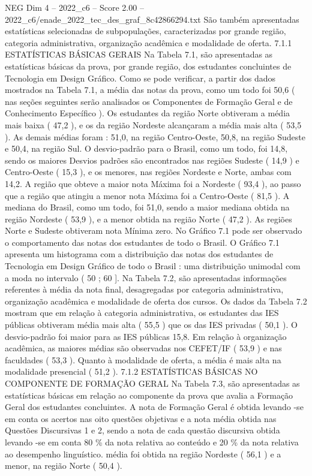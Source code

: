 \begin{textsample}{NEG Dim 4 – 2022\_c6 – Score 2.00 – 2022\_c6/enade\_2022\_tec\_des\_graf\_8c42866294.txt}
São também apresentadas estatísticas selecionadas de subpopulações, caracterizadas por grande região, categoria administrativa, organização acadêmica e modalidade de oferta. 7.1.1 ESTATÍSTICAS BÁSICAS GERAIS Na Tabela 7.1, são apresentadas as estatísticas básicas da prova, por grande região, dos estudantes concluintes de Tecnologia em Design Gráfico.
Como se pode verificar, a partir dos dados mostrados na Tabela 7.1, a média das notas da prova, como um todo foi 50,6 ( nas seções seguintes serão analisados os Componentes de Formação Geral e de Conhecimento Específico ).
Os estudantes da região Norte obtiveram a média mais baixa ( 47,2 ), e os da região Nordeste alcançaram a média mais alta ( 53,5 ).
As demais médias foram : 51,0, na região Centro-Oeste, 50,8, na região Sudeste e 50,4, na região Sul.
O desvio-padrão para o Brasil, como um todo, foi 14,8, sendo os maiores Desvios padrões são encontrados nas regiões Sudeste ( 14,9 ) e Centro-Oeste ( 15,3 ), e os menores, nas regiões Nordeste e Norte, ambas com 14,2.
A região que obteve a maior nota Máxima foi a Nordeste ( 93,4 ), ao passo que a região que atingiu a menor nota Máxima foi a Centro-Oeste ( 81,5 ).
A mediana do Brasil, como um todo, foi 51,0, sendo a maior mediana obtida na região Nordeste ( 53,9 ), e a menor obtida na região Norte ( 47,2 ).
As regiões Norte e Sudeste obtiveram nota Mínima zero.
No Gráfico 7.1 pode ser observado o comportamento das notas dos estudantes de todo o Brasil.
O Gráfico 7.1 apresenta um histograma com a distribuição das notas dos estudantes de Tecnologia em Design Gráfico de todo o Brasil : uma distribuição unimodal com a moda no intervalo ( 50 ; 60 ].
Na Tabela 7.2, são apresentadas informações referentes à média da nota final, desagregadas por categoria administrativa, organização acadêmica e modalidade de oferta dos cursos.
Os dados da Tabela 7.2 mostram que em relação à categoria administrativa, os estudantes das IES públicas obtiveram média mais alta ( 55,5 ) que os das IES privadas ( 50,1 ).
O desvio-padrão foi maior para as IES públicas 15,8.
Em relação à organização acadêmica, as maiores médias são observadas nos CEFET/IF ( 53,9 ) e nas faculdades ( 53,3 ).
Quanto à modalidade de oferta, a média é mais alta na modalidade presencial ( 51,2 ). 7.1.2 ESTATÍSTICAS BÁSICAS NO COMPONENTE DE FORMAÇÃO GERAL Na Tabela 7.3, são apresentadas as estatísticas básicas em relação ao componente da prova que avalia a Formação Geral dos estudantes concluintes.
A nota de Formação Geral é obtida levando -se em conta os acertos nas oito questões objetivas e a nota média obtida nas Questões Discursivas 1 e 2, sendo a nota de cada questão discursiva obtida levando -se em conta 80 \% da nota relativa ao conteúdo e 20 \% da nota relativa ao desempenho linguístico. média foi obtida na região Nordeste ( 56,1 ) e a menor, na região Norte ( 50,4 ).

\end{textsample}
